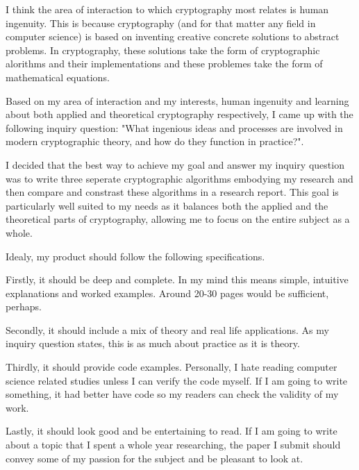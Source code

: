 \documentclass[12pt, a4paper, draft]{report}
\begin{document}

I think the area of interaction to which cryptography most relates is
human ingenuity. This is because cryptography (and for that matter any
field in computer science) is based on inventing creative concrete
solutions to abstract problems. In cryptography, these solutions
take the form of cryptographic alorithms and their implementations
and these problemes take the form of mathematical equations.

Based on my area of interaction and my interests, human ingenuity and
learning about both applied and theoretical cryptography respectively, I
came up with the following inquiry question: "What ingenious ideas and
processes are involved in modern cryptographic theory, and how do they
function in practice?".

I decided that the best way to achieve my goal and answer my inquiry
question was to write three seperate cryptographic algorithms embodying
my research and then compare and constrast these algorithms in a research
report. This goal is particularly well suited to my needs as it balances
both the applied and the theoretical parts of cryptography, allowing me to
focus on the entire subject as a whole.

Idealy, my product should follow the following specifications.

Firstly, it should be deep and complete. In my mind this means simple,
intuitive explanations and worked examples. Around 20-30 pages would be
sufficient, perhaps.

Secondly, it should include a mix of theory and real life applications.
As my inquiry question states, this is as much about practice as it is
theory.

Thirdly, it should provide code examples. Personally, I hate reading
computer science related studies unless I can verify the code myself.
If I am going to write something, it had better have code so my
readers can check the validity of my work.

Lastly, it should look good and be entertaining to read. If I am
going to write about a topic that I spent a whole year researching,
the paper I submit should convey some of my passion for the subject
and be pleasant to look at.
\end{document}
